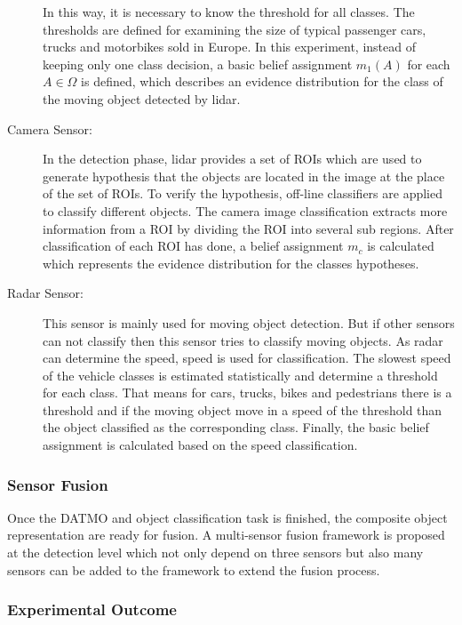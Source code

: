 \begin{description}
    In this way, it is necessary to know the threshold for all classes. The thresholds are defined for examining the size of typical passenger cars, trucks and motorbikes sold in Europe\cite{Chavez_Garcia_2016}. In this experiment, instead of keeping only one class decision, a basic belief assignment $m_{1}(A)$ for each $ A \in \Omega $ is defined, which describes an evidence distribution for the class of the moving object detected by lidar\cite{Chavez_Garcia_2016}.
    \item[Camera Sensor:] In the detection phase, lidar provides a set of ROIs which are used to generate hypothesis that the objects are located in the image at the place of the set of ROIs. To verify the hypothesis, off-line classifiers are applied to classify different objects. The camera image classification extracts more information from a ROI by dividing the ROI into several sub regions. After classification of each ROI has done, a belief assignment $m_{c}$ is calculated which represents the evidence distribution for the classes hypotheses\cite{Chavez_Garcia_2016}.
    \item[Radar Sensor:] This sensor is mainly used for moving object detection. But if other sensors can not classify then this sensor tries to classify moving objects. As radar can determine the speed, speed is used for classification. The slowest speed of the vehicle classes is estimated statistically and determine a threshold for each class. That means for cars, trucks, bikes and pedestrians there is a threshold and if the moving object move in a speed of the threshold than the object classified as the corresponding class. Finally, the basic belief assignment is calculated based on the speed classification\cite{Chavez_Garcia_2016}.
\end{description}

\subsubsection{Sensor Fusion}
Once the DATMO and object classification task is finished, the composite object representation are ready for fusion. A multi-sensor fusion framework is proposed at the detection level which not only depend on three sensors but also many sensors can be added to the framework to extend the fusion process\cite{Chavez_Garcia_2016}.

\subsubsection{Experimental Outcome}


